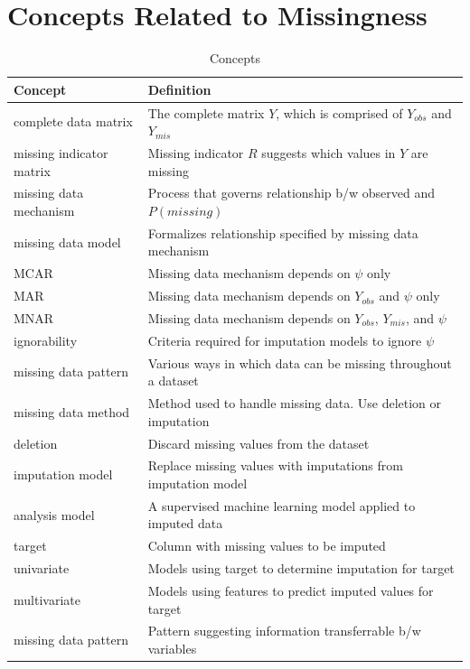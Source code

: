 \documentclass[12pt,oneside]{chicagocapstone}
\begin{document}
\chapter{Concepts Related to
Missingness}\label{concepts-related-to-missingness}
\begin{longtabu} to 
\caption{\label{tab:appendixdconcepts}Concepts}\\
\toprule
\begingroup\fontsize{13}{15}\selectfont \textbf{Concept}\endgroup & \begingroup\fontsize{13}{15}\selectfont \textbf{Definition}\endgroup\\
\midrule
complete data matrix & The complete matrix $Y$, which is comprised of $Y_{obs}$ and $Y_{mis}$\\
missing indicator matrix & Missing indicator $R$ suggests which values in $Y$ are missing\\
missing data mechanism & Process that governs relationship b/w observed and $P(missing)$\\
missing data model & Formalizes relationship specified by missing data mechanism\\
MCAR & Missing data mechanism depends on $\psi$ only\\
\addlinespace
MAR & Missing data mechanism depends on $Y_{obs}$ and $\psi$ only\\
MNAR & Missing data mechanism depends on $Y_{obs}$, $Y_{mis}$, and $\psi$\\
ignorability & Criteria required for imputation models to ignore $\psi$\\
missing data pattern & Various ways in which data can be missing throughout a dataset\\
missing data method & Method used to handle missing data. Use deletion or imputation\\
\addlinespace
deletion & Discard missing values from the dataset\\
imputation model & Replace missing values with imputations from imputation model\\
analysis model & A supervised machine learning model applied to imputed data\\
target & Column with missing values to be imputed\\
univariate & Models using target to determine imputation for target\\
\addlinespace
multivariate & Models using features to predict imputed values for target\\
missing data pattern & Pattern suggesting information transferrable b/w variables\\

\end{longtabu}
\end{document}
